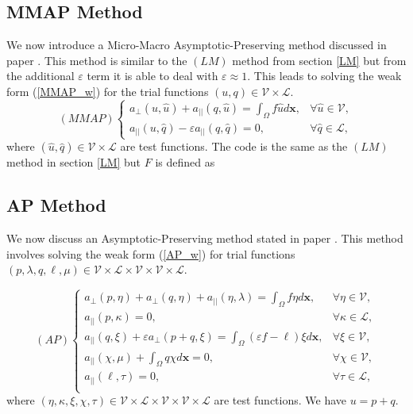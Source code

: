 \documentclass[12pt]{ociamthesis}
\begin{document}
\subsection{MMAP Method} \label{MMAP}
We now introduce a Micro-Macro Asymptotic-Preserving method discussed in paper \cite{MMAP}. This method is similar to the $(LM)$ method from section \ref{LM} but from the additional $\varepsilon$ term it is able to deal with $\varepsilon \approx 1$. This leads to solving the weak form (\ref{MMAP_w}) for the trial functions $(u, q) \in  \mathcal{V} \times \mathcal{L}$. 
\begin{equation} \label{MMAP_w}
(MMAP)
\begin{cases}
a_{\perp}(u, \hat{u}) + a_{||}(q, \hat{u}) = \int_{\Omega} f \hat{u} d\mathbf{x}, 
&\forall \hat{u} \in \mathcal{V}, \\
a_{||}(u, \hat{q}) - \varepsilon a_{||}(q, \hat{q}) = 0, 
&\forall \hat{q} \in \mathcal{L},
\end{cases}
\end{equation}
where $(\hat{u}, \hat{q}) \in \mathcal{V}\times \mathcal{L} $ are test functions. The code is the same as the $(LM)$ method in section \ref{LM} but $F$ is defined as 


\subsection{AP Method} \label{AP}
We now discuss an Asymptotic-Preserving method stated in paper \cite{AP}. This method involves solving the weak form (\ref{AP_w}) for trial functions $(p, \lambda, q, \ell, \mu) \in \mathcal{V} \times \mathcal{L}  \times \mathcal{V}  \times \mathcal{V}  \times \mathcal{L}$.

\begin{equation} \label{AP_w}
(AP)
\begin{cases}
a_{\perp}(p, \eta)+a_{\perp}(q, \eta) + a_{||}(\eta, \lambda) = \int_{\Omega}f \eta d\mathbf{x},
&\forall \eta \in \mathcal{V},\\
a_{||}(p, \kappa) = 0, 
&\forall \kappa \in \mathcal{L},\\
a_{||}(q, \xi) + \varepsilon a_{\perp}(p+q, \xi) = 
\int_{\Omega} (\varepsilon f -\ell)\xi d\mathbf{x},
&\forall \xi \in \mathcal{V},\\
a_{||}(\chi, \mu) + \int_{\Omega}q \chi d\mathbf{x} = 0,
&\forall \chi \in \mathcal{V},\\
a_{||}(\ell, \tau) = 0,
&\forall \tau \in \mathcal{L},\\
\end{cases}
\end{equation}
where $(\eta, \kappa, \xi, \chi, \tau)\in \mathcal{V} \times \mathcal{L}  \times \mathcal{V}  \times \mathcal{V}  \times \mathcal{L}$ are test functions. We have $u=p+q$.
\end{document}
